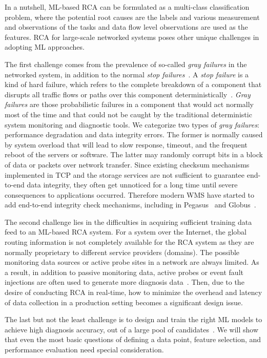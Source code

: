 In a nutshell, ML-based RCA can be formulated as a multi-class classification problem, where the potential root causes are the labels and various 
measurement and observations of the tasks and data flow level observations are used as the features.
RCA for large-scale networked systems poses other unique challenges in adopting ML approaches.
 
The first challenge comes from the prevalence of so-called {\it gray failures} in the networked system, in addition to the normal {\it stop failures}~\cite{GrayFailure:2017,DeepView:NSDI18}. A {\it stop failure} is a kind of hard failure, which refers to the complete breakdown of a component that disrupts all traffic flows or paths over this component deterministically~\cite{Link-JIoT-2019}. {\it Gray failures} are those probabilistic failures in a component that would act normally most of the time and that could not be caught by the traditional deterministic system monitoring and diagnostic tools. We categorize two types of  {\it gray failures}: performance degradation and data integrity errors. The former is normally caused by system overload that will lead to slow response, timeout, and the frequent reboot of the servers or software. The latter may randomly corrupt bits in a block of data or packets over network transfer. Since existing checksum mechanisms implemented in TCP and the storage services are not sufficient to guarantee end-to-end data integrity, they often get unnoticed for a long time until severe consequences to applications occurred. Therefore modern WMS have started to add end-to-end integrity check mechanisms, including in Pegasus~\cite{swip:pearc:2019} and Globus~\cite{IntegrityVerification:DataTransfer}.

The second challenge lies in the difficulties in acquiring sufficient training data feed to an ML-based RCA system. For a system over the Internet, the global routing information is not completely available for the RCA system as they are normally proprietary to different service providers (domains). The possible monitoring data sources or active probe sites in a network are always limited. As a result, in addition to passive monitoring data, active probes or event fault injections are often used to generate more diagnosis data~\cite{active:iot:2019, NetPoirot:Sigcomm2016}. Then, due to the desire of conducting RCA in real-time, how to minimize the overhead and latency of data collection in a production setting becomes a significant design issue.

The last but not the least challenge is to design and train the right ML models to achieve high diagnosis accuracy, out of a large pool of candidates~\cite{Boutaba:2018aa}. We will show that even the most basic questions of defining a data point, feature selection, and performance evaluation need special consideration.

